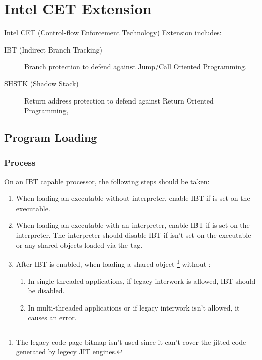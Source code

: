 \chapter{Intel CET Extension}

Intel CET (Control-flow Enforcement Technology) Extension includes:

\begin{description}
  \item[IBT (Indirect Branch Tracking)] Branch protection to defend
    against Jump/Call Oriented Programming.
  \item [SHSTK (Shadow Stack)] Return address protection to defend
    against Return Oriented Programming,
\end{description}

\section{Program Loading}

\subsection{Process }
\label{ibt}

On an IBT capable processor, the following steps should be taken:

\begin{enumerate}
  \item
    \begin{sloppypar}
      When loading an executable without interpreter, enable IBT if
       is set on the executable.
    \end{sloppypar}
  \item
    \begin{sloppypar}
      When loading an executable with an interpreter, enable IBT if
       is set on the interpreter.
      The interpreter should disable IBT if
       isn't set on the executable
      or any shared objects loaded via the  tag.
    \end{sloppypar}
  \item
    \begin{sloppypar}
      After IBT is enabled, when loading a shared object
      \footnote{The legacy code page bitmap isn't used since it can't
      cover the jitted code generated by legecy JIT engines.}
      without :
    \end{sloppypar}
    \begin{enumerate}
      \item In single-threaded applications, if legacy interwork is
      allowed, IBT should be disabled.
      \item In multi-threaded applications or if legacy interwork isn't
      allowed, it causes an error.
    \end{enumerate}
\end{enumerate}

